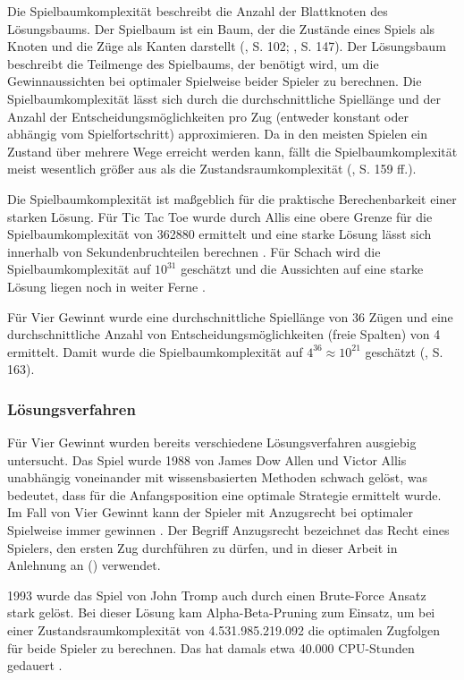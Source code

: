 Die Spielbaumkomplexität beschreibt die Anzahl der Blattknoten des Lösungsbaums. Der Spielbaum ist ein Baum, der die Zustände eines Spiels als Knoten und die Züge als Kanten darstellt (\cite{Bewersdorff.2018}, S. 102; \cite{Russell.2020}, S. 147). Der Lösungsbaum beschreibt die Teilmenge des Spielbaums, der benötigt wird, um die Gewinnaussichten bei optimaler Spielweise beider Spieler zu berechnen. Die Spielbaumkomplexität lässt sich durch die durchschnittliche Spiellänge und der Anzahl der Entscheidungsmöglichkeiten pro Zug (entweder konstant oder abhängig vom Spielfortschritt) approximieren. Da in den meisten Spielen ein Zustand über mehrere Wege erreicht werden kann, fällt die Spielbaumkomplexität meist wesentlich größer aus als die Zustandsraumkomplexität (\cite{Allis.1994}, S. 159 ff.).

Die Spielbaumkomplexität ist maßgeblich für die praktische Berechenbarkeit einer starken Lösung. Für Tic Tac Toe wurde durch Allis eine obere Grenze für die Spielbaumkomplexität von 362880 ermittelt und eine starke Lösung lässt sich innerhalb von Sekundenbruchteilen berechnen \cite{Paul.2009}. Für Schach wird die Spielbaumkomplexität auf $10^{31}$ geschätzt und die Aussichten auf eine starke Lösung liegen noch in weiter Ferne \cite{Schaeffer.2007}.

Für Vier Gewinnt wurde eine durchschnittliche Spiellänge von 36 Zügen und eine durchschnittliche Anzahl von Entscheidungsmöglichkeiten (freie Spalten) von 4 ermittelt. Damit wurde die Spielbaumkomplexität auf $4^{36} \approx 10^{21}$ geschätzt (\cite{Allis.1994}, S. 163).

\subsubsection{Lösungsverfahren}

Für Vier Gewinnt wurden bereits verschiedene Lösungsverfahren ausgiebig untersucht. Das Spiel wurde 1988 von James Dow Allen und Victor Allis unabhängig voneinander mit wissensbasierten Methoden schwach gelöst, was bedeutet, dass für die Anfangsposition eine optimale Strategie ermittelt wurde. Im Fall von Vier Gewinnt kann der Spieler mit Anzugsrecht bei optimaler Spielweise immer gewinnen \cite{Allen.2010} \cite{Allis.1988}. Der Begriff Anzugsrecht bezeichnet das Recht eines Spielers, den ersten Zug durchführen zu dürfen, und in dieser Arbeit in Anlehnung an (\cite{Bewersdorff.2018}) verwendet.

1993 wurde das Spiel von John Tromp auch durch einen Brute-Force Ansatz stark gelöst. Bei dieser Lösung kam Alpha-Beta-Pruning zum Einsatz, um bei einer Zustandsraumkomplexität von 4.531.985.219.092 die optimalen Zugfolgen für beide Spieler zu berechnen. Das hat damals etwa 40.000 CPU-Stunden gedauert \cite{Tromp}.

